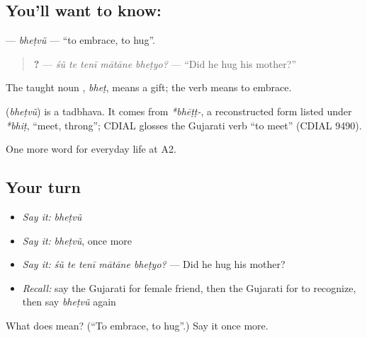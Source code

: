 \subsection*{You'll want to know: }
\textbf{} — \emph{bheṭvũ} — \textquotedblleft{}to embrace, to hug\textquotedblright{}.

\begin{quote}
\textbf{    ?} — \emph{śũ te tenī mātāne bheṭyo?} — \textquotedblleft{}Did he hug his mother?\textquotedblright{}
\end{quote}

The taught noun \textbf{}, \emph{bheṭ}, means a gift; the verb means to embrace.

\begin{cousinweb}
\textbf{} (\emph{bheṭvũ}) is a tadbhava. It comes from \emph{*bhēṭṭ-}, a reconstructed form listed under \emph{*bhiṭ}, \textquotedblleft{}meet, throng\textquotedblright{}; CDIAL glosses the Gujarati verb \textquotedblleft{}to meet\textquotedblright{} (CDIAL 9490).
\end{cousinweb}

\begin{grammarlens}[title={What you've built}]
One more word for everyday life at A2.
\end{grammarlens}

\subsection*{Your turn}
\begin{itemize}
\raggedright
  \item \emph{Say it:} \emph{bheṭvũ}
  \item \emph{Say it:} \emph{bheṭvũ}, once more
  \item \emph{Say it:} \emph{śũ te tenī mātāne bheṭyo?} — Did he hug his mother?
  \item \emph{Recall:} say the Gujarati for female friend, then the Gujarati for to recognize, then say \emph{bheṭvũ} again
\end{itemize}

\begin{tcolorbox}[breakable,colback=teal!4,colframe=teal!35!black,title={Before you move on}]
What does  mean? (\textquotedblleft{}To embrace, to hug\textquotedblright{}.) Say it once more.
\end{tcolorbox}

